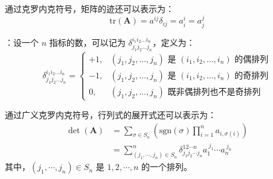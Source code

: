 \begin{example}
    通过克罗内克符号，矩阵的迹还可以表示为：
    \[
        \mathrm{tr}(\mathbf{A}) = a^{ij} \delta_{ij} = a_i^{i} = a_j^j  
    \]
    \label{ex:kronecker_trace}
\end{example}

\begin{definition}：设一个 $n$ 指标的数，可以记为 $\delta_{j_1 j_2 \ldots j_n}^{i_1 i_2 \ldots i_n}$，定义为：
\[
    \delta_{j_1 j_2 \ldots j_n}^{i_1 i_2 \ldots i_n} = \begin{cases}
        +1, & (j_1, j_2, \ldots, j_n) \text{ 是 } (i_1, i_2, \ldots, i_n) \text{ 的偶排列} \\
        -1, & (j_1, j_2, \ldots, j_n) \text{ 是 } (i_1, i_2, \ldots, i_n) \text{ 的奇排列} \\
        0, & (j_1, j_2, \ldots, j_n) \text{ 既非偶排列也不是奇排列}
    \end{cases}
\]
\label{def:generalized_kronecker_delta}
\end{definition}

\begin{example}
    通过广义克罗内克符号，行列式的展开式还可以表示为：
    \begin{align*}
        \det(\mathbf{A}) &= \sum_{\sigma \in S_n} \left( \mathrm{sgn}(\sigma) \prod_{i=1}^{n} a_{i,\sigma(i)} \right) \\
        &= \sum_{(j_1, \cdots, j_n)\in S_n}^{n} \delta^{1 2 \cdots n}_{j_1 j_2 \cdots j_n}  a_{1}^{\ j_1}\cdots a_{n}^{\ j_n}
        \label{eq:generalized_kronecker_determinant}
    \end{align*}
    其中，$(j_1,\cdots,j_n)\in S_n$ 是 $1,2,\cdots,n$ 的一个排列。
    \label{ex:generalized_kronecker_determinant}
\end{example}

\newpage
